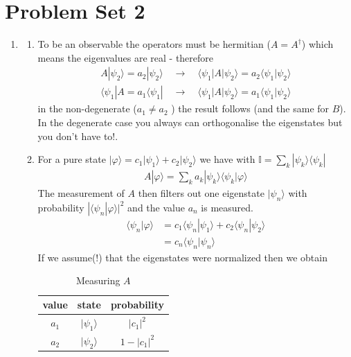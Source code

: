 \documentclass{article}
\begin{document}
\section*{Problem Set 2}
\begin{enumerate}
    \item 
    \begin{enumerate}
        \item To be an observable the operators must be hermitian ($A=A^\dagger$)  which means the eigenvalues are real - therefore 
        \begin{align}
            A|\psi_2\rangle=a_2|\psi_2\rangle\quad\rightarrow\quad \langle\psi_1|A|\psi_2\rangle=a_2\langle\psi_1|\psi_2\rangle\\
            \langle\psi_1|A=a_1\langle\psi_1|\quad\rightarrow\quad \langle\psi_1|A|\psi_2\rangle=a_1\langle\psi_1|\psi_2\rangle
        \end{align}
        in the non-degenerate ($a_1\ne a_2$ ) the result follows (and the same for $B$). In the degenerate case you always can orthogonalise the eigenstates but you don't have to!.
    
    \item For a pure state $|\varphi\rangle=c_1|\psi_1\rangle+c_2|\psi_2\rangle$ we have with $\mathbb{I}=\sum_k|\psi_k\rangle\langle\psi_k|$
    \begin{align}
        A|\varphi\rangle=\sum_ka_k|\psi_k\rangle\langle\psi_k|\varphi\rangle
    \end{align}
    The measurement of $A$ then filters out one eigenstate $|\psi_n\rangle$ with probability $|\langle\psi_n|\varphi\rangle|^2$ and the value $a_n$ is measured.
    \begin{align}
        \langle\psi_n|\varphi\rangle
        &=c_1\langle\psi_n|\psi_1\rangle+c_2\langle\psi_n|\psi_2\rangle\\
        &=c_n\langle\psi_n|\psi_n\rangle
    \end{align}
    If we assume(!) that the eigenstates were normalized then we obtain
    \begin{table}[!h]
        \centering
        \begin{tabular}{|c|c|c|}
        \hline
            value & state & probability\\
            \hline\hline
            $a_1$ & $|\psi_1\rangle$ & $|c_1|^2$ \\ \hline
            $a_2$ & $|\psi_2\rangle$ & $1-|c_1|^2$\\
            \hline
        \end{tabular}
        \caption{Measuring $A$}
        \label{tab:my_label}
    \end{table}
    

\end{enumerate}
\end{enumerate}
\end{document}
